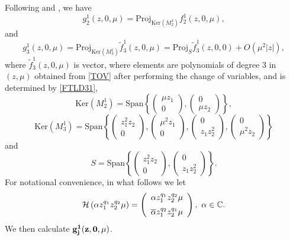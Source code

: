 \documentclass[11pt]{article}
\theoremstyle{definition}
\theoremstyle{remark}
\numberwithin{equation}{section}
\begin{document}
Following   \cite{Faria-00TAMS} and  \cite{Faria-JDE1995},   we have
$$
g_2^1(z, 0,\mu)=\mbox{Proj}_{\mbox{Ker}(M_2^1)}f_2^1(z,0,\mu),
$$
and
\begin{equation}
\label{G310}
g_3^1(z,0,\mu)=\mbox{Proj}_{\mbox{Ker}(M_3^1)}\widetilde{f}_3^1(z,0,\mu)=\mbox{Proj}_{S}\widetilde{f}_3^1(z,0,0)+O(\mu^2|z|),
\end{equation}
where  $\widetilde{f}_3^1(z,0,\mu)$ is vector, where elements are polynomials of degree 3 in $(z, \mu)$ obtained from \eqref{TOV} after performing the change of variables, and is determined by  \eqref{FTLD31},
\begin{equation*}
\mbox{Ker}\left(M_2^1\right)=\mbox{Span}\left\{
\left(\begin{array}{l}
 \mu z_1\\
0
\end{array}
\right),
\left(\begin{array}{l}
0\\
\mu z_2
\end{array}
\right)\right\},
 \end{equation*}
\begin{equation*}
\mbox{Ker}\left(M_3^1\right)=\mbox{Span}\left\{
\left(\begin{array}{l}
z_1^2z_2\\
0
\end{array}
\right),
 \left(\begin{array}{l}
\mu^2 z_1\\
0
\end{array}
\right),
\left(\begin{array}{l}
0\\
z_1z_2^2
\end{array}
\right),
 \left(\begin{array}{l}
0\\
\mu^2 z_2
\end{array}
\right)
\right\}
 \end{equation*}
and
$$
S=\mbox{Span}\left\{
\left(\begin{array}{l}
z_1^2z_2\\
0
\end{array}
\right),
\left(\begin{array}{l}
0\\
z_1z_2^2
\end{array}
\right)
\right\}.
$$
For notational convenience, in what follows we let
$$\mathcal{H}\left(\alpha z_1^{q_1}z_2^{q_2} \mu \right)=\left(\begin{array}{c}
\alpha z_1^{q_1}z_2^{q_2}\mu \vspace{0.2cm}\\
\overline{\alpha}z_1^{q_2}z_2^{q_1}\mu
\end{array}\right), ~\alpha\in \mathbb{C}.$$
We then calculate $\bf{g_j^1(z,0,\mu)}$.
\end{document}

